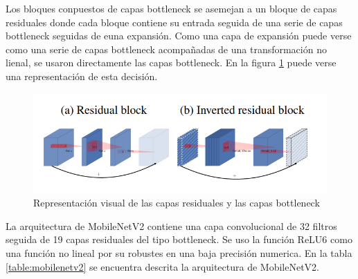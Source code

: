
Los bloques conpuestos de capas bottleneck se asemejan a un bloque de capas residuales donde cada bloque contiene su entrada seguida de una serie de capas bottleneck seguidas de euna expansión\cite{Deep_2015}. Como una capa de expansión puede verse como una serie de capas bottleneck acompañadas de una transformación no lienal, se usaron directamente las capas bottleneck. En la figura \ref{fig:residual_block} puede verse una representación de esta decisión.

\begin{figure}[H]
    \centering
    \includegraphics[width=15cm]{Graphics/mobilenetv2.png}
    \caption{Representación visual de las capas residuales y las capas bottleneck}
    \label{fig:residual_block}
\end{figure}


La arquitectura de MobileNetV2 contiene una capa convolucional de 32 filtros seguida de 19 capas residuales del tipo bottleneck. Se uso la función ReLU6 como una función no lineal por su robustes en una baja precisión numerica\cite{Howard_2017}. En la tabla \ref{table:mobilenetv2} se encuentra descrita la arquitectura de MobileNetV2.

